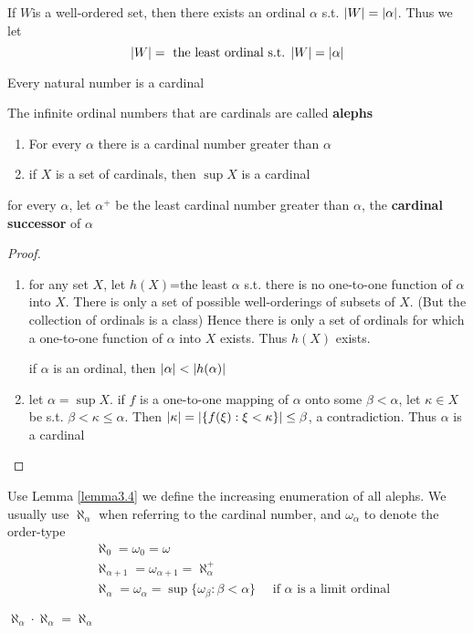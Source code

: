 \documentclass[11pt]{article}
\begin{document}
If \(W\)is a well-ordered set, then there exists an ordinal \(\alpha\) s.t. \(\abs{W}=\abs{\alpha}\). Thus we
let
\begin{equation*}
\abs{W}=\text{ the least ordinal s.t. }\abs{W}=\abs{\alpha}
\end{equation*}

Every natural number is a cardinal

The infinite ordinal numbers that are cardinals are called \textbf{alephs}

\begin{lemma}[]
\label{lemma3.4}
\begin{enumerate}
\item For every \(\alpha\) there is a cardinal number greater than \(\alpha\)
\item if \(X\) is a set of cardinals, then \(\sup X\) is a cardinal
\end{enumerate}
\end{lemma}

for every \(\alpha\), let \(\alpha^+\) be the least cardinal number greater than \(\alpha\), the \textbf{cardinal successor} of
\(\alpha\)

\begin{proof}
\begin{enumerate}
\item for any set \(X\), let \(h(X)\)=the least \(\alpha\) s.t. there is no one-to-one function of \(\alpha\)
into \(X\). There is only a set of possible well-orderings of subsets of \(X\).
(But the collection of ordinals is a class)
Hence there is only a set of ordinals for which a one-to-one function of \(\alpha\) into \(X\) exists.
Thus \(h(X)\) exists.

if \(\alpha\) is an ordinal, then \(\abs{\alpha}<\abs{h(\alpha)}\)

\item let \(\alpha=\sup X\). if \(f\) is a one-to-one mapping of \(\alpha\) onto some \(\beta<\alpha\), let \(\kappa\in X\) be
s.t. \(\beta<\kappa\le\alpha\). Then \(\abs{\kappa}=\abs{\{f(\xi):\xi<\kappa\}}\le\beta\), a contradiction. Thus \(\alpha\) is a cardinal
\end{enumerate}
\end{proof}

Use Lemma \ref{lemma3.4} we define the increasing enumeration of all alephs. We usually
use \(\aleph_\alpha\) when referring to the cardinal number, and \(\omega_\alpha\) to denote the order-type
\begin{align*}
&\aleph_0=\omega_0=\omega\\
&\aleph_{\alpha+1}=\omega_{\alpha+1}=\aleph_\alpha^+\\
&\aleph_\alpha=\omega_\alpha=\sup\{\omega_\beta:\beta<\alpha\}\quad\text{ if \(\alpha\) is a limit ordinal}
\end{align*}
\begin{theorem}[]
\label{thm3.5}
\(\aleph_\alpha\cdot\aleph_\alpha=\aleph_\alpha\)
\end{theorem}
\end{document}

